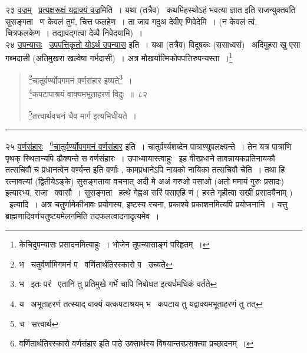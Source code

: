 \documentclass[11pt, openany]{book}
\begin{document}
२३ \underline{वज्रम्} \textendash\ \underline{प्रत्यक्षरूक्षं यद्वाक्यं वज्र}मिति~। यथा (तत्रैव) \textendash\ {\qt कथमिहस्थोऽहं भवत्या ज्ञात} इति राजन्युक्तवति सुसङ्गता \textendash\ ण केवलं तुमं, चित्त फलहेण~। ता जाव गदुअ देवीए णिवेदेमि~। (न केवलं त्वं, चित्रफलकेण~। तद्यावद्गत्वा देव्यै निवेदयामि)~।\\

२४ \underline{उपन्यासः} \textendash\ \underline{उपपत्तिकृतो योऽर्थ उपन्यास} इति~। यथा (तत्रैव) विदूषकः (ससाध्वसं) \textendash\ अदिमुहरा खु एसा गब्भदासी (अतिमुखरा खल्वेषा गर्भदासी)~। अत्र मौखर्यात्मिकोपपत्तिरुपन्यस्ता~।\renewcommand{\thefootnote}{$\dagger$}\footnote{केचिदुपन्यासः प्रसादनमित्याहुः~। भोजेन तूपन्यासाङ्गं परिहृतम्~।}

\newpage

\begin{quote}
{\na \renewcommand{\thefootnote}{1}\footnote{भ \textendash\ चतुर्वर्णामिगमनं प \textendash\ वर्णितार्थतिरस्कारो प \textendash\ उच्यते}चातुर्वर्ण्योपगमनं वर्णसंहार इष्यते\renewcommand{\thefootnote}{2}\footnote{भ \textendash\ इतः परं \textendash\ {\qt एतानि तु प्रतिमुखे गर्भे चापि निबोधत} इत्यर्धमधिकं वर्तते}~।\\
\renewcommand{\thefootnote}{3}\footnote{य \textendash\ अभूताहरणं तत्स्याद् वाक्यं यत्कपटाश्रयम् भ \textendash\ कपटाय तु यद्वाक्यमभूताहरणं तु तत्}कपटापाश्रयं वाक्यमभूताहरणं विदुः~॥~८२

\renewcommand{\thefootnote}{4}\footnote{च \textendash\ सत्त्वार्थ}तत्त्वार्थवचनं चैव मार्ग इत्यभिधीयते~।}
\end{quote}

\hrule

\vspace{2mm}
२५ \underline{वर्णसंहारः} \textendash\ \underline{\renewcommand{\thefootnote}{*}\footnote{वर्णितार्थतिरस्कारो वर्णसंहार इति पाठे उक्तार्थस्य विषयान्तरप्रसक्त्या प्रच्छादनम्~।}चातुर्वर्ण्योपगमनं वर्णसंहार} इति~। चातुर्वर्ण्यशब्देन पात्राण्युपलक्ष्यन्ते~। तेन यत्र पात्राणि पृथक् स्थितान्यपि ढौक्यन्ते स वर्णसंहारः~। उपाध्यायास्त्वाहुः \textendash\ इह वीरप्रधाने तावन्नायकप्रतिनायकौ तत्सचिवौ च प्रधानत्वेन वर्ण्यन्त इति वर्णाः , कामप्रधानेऽपि नायको नायिका तत्सचिवौ चेति~। तथा हि रत्नावल्यां (द्वितीयेऽङ्के) सुसङ्गताया वचनात् {\qt अदी मे अअं गरुओ पसाओ (अतो ममायं गुरुः प्रसादः)} इत्यारभ्य, राजा \textendash\ क्वासौ~। सुसङ्गता \textendash\ हत्थे गेह्वअ सरिं पसाएहि णं ( हस्ते गृहीत्वा सखीं प्रसादयैनाम् ) \textendash\ इत्यादि~। अत्र चतुर्णामेकीभावः प्रयोगस्य, इष्टस्य रचना, प्रकाश्ये प्रकाशनमित्यपि प्रयोजनानि~। यत्तु ब्राह्मणादिवर्णचतुष्टयमेलनमिति तदफलत्वादनादृत्यमेव~।\\
\end{document}
